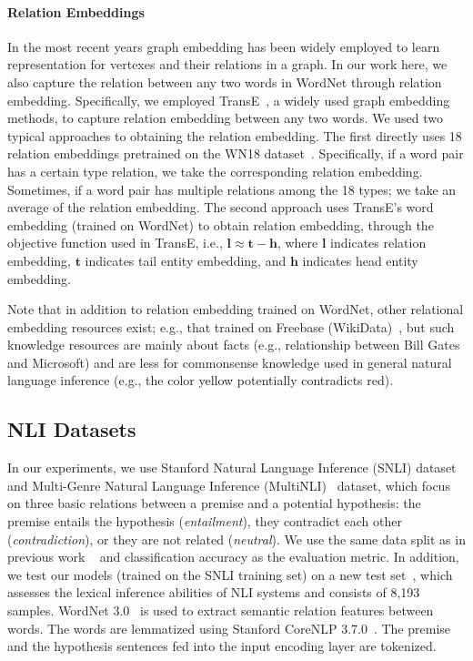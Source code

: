 \documentclass[11pt,a4paper]{article}
\newcommand{\vect}[1]{\bm{#1}}
\begin{document}
\paragraph{Relation Embeddings} In the most recent years graph embedding has been widely employed to learn representation for vertexes and their relations in a graph. In our work here, we also capture the relation between any two words in WordNet through relation embedding. Specifically, we employed TransE~\citep{DBLP:conf/nips/BordesUGWY13}, a widely used graph embedding methods, to capture relation embedding between any two words. We used two typical approaches to obtaining the relation embedding. The first directly uses 18 relation embeddings pretrained on the WN18 dataset~\citep{DBLP:conf/nips/BordesUGWY13}. Specifically, if a word pair has a certain type relation, we take the corresponding relation embedding. Sometimes, if a word pair has multiple relations among the 18 types; we take an average of the relation embedding. The second approach uses TransE's word embedding (trained on WordNet) to obtain relation embedding, through the objective function used in TransE, i.e., ${\vect l} \approx {\vect t} - {\vect h}$, where ${\vect l}$ indicates relation embedding, ${\vect t}$ indicates tail entity embedding, and ${\vect h}$ indicates head entity embedding. 

Note that in addition to relation embedding trained on WordNet, other relational embedding resources exist; e.g., that trained on Freebase (WikiData)~\citep{DBLP:conf/aaai/BollackerCT07}, but such knowledge resources are mainly about facts (e.g., relationship between Bill Gates and Microsoft) and are less for commonsense knowledge used in general natural language inference (e.g., the color yellow potentially contradicts red).

\subsection{NLI Datasets}
In our experiments, we use Stanford Natural Language Inference (SNLI) dataset~\citep{DBLP:conf/emnlp/BowmanAPM15} and Multi-Genre Natural Language Inference (MultiNLI)~\citep{DBLP:journals/corr/WilliamsNB17} dataset, which focus on three basic relations between a premise and a potential hypothesis: the premise entails the hypothesis (\textit{entailment}), they contradict each other (\textit{contradiction}), or they are not related (\textit{neutral}). 
We use the same data split as in previous work ~\citep{DBLP:conf/emnlp/BowmanAPM15,DBLP:journals/corr/WilliamsNB17} and classification accuracy as the evaluation metric. 
In addition, we test our models (trained on the SNLI training set) on a new test set~\citep{glockner_acl18}, which assesses the lexical inference abilities of NLI systems and consists of 8,193 samples.
WordNet 3.0~\citep{DBLP:journals/cacm/Miller95} is used to extract semantic relation features between words. The words are lemmatized using Stanford CoreNLP 3.7.0~\citep{DBLP:conf/acl/ManningSBFBM14}. The premise and the hypothesis sentences fed into the input encoding layer are tokenized.
\end{document}
